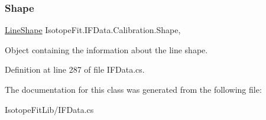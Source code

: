 \mbox{\label{class_isotope_fit_1_1_i_f_data_1_1_calibration_ad0c3e0969448ad0cc57307c77c2222eb}} 
\subsubsection{\texorpdfstring{Shape}{Shape}}
{\footnotesize\ttfamily \hyperlink{class_isotope_fit_1_1_i_f_data_1_1_calibration_1_1_line_shape}{Line\+Shape} Isotope\+Fit.\+I\+F\+Data.\+Calibration.\+Shape\hspace{0.3cm}{\ttfamily [get]}, {\ttfamily [set]}}



Object containing the information about the line shape. 



Definition at line 287 of file I\+F\+Data.\+cs.



The documentation for this class was generated from the following file\+:\begin{DoxyCompactItemize}
\item 
Isotope\+Fit\+Lib/I\+F\+Data.\+cs\end{DoxyCompactItemize}
